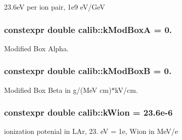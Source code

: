 23.\-6e\-V per ion pair, 1e9 e\-V/\-Ge\-V 

\hypertarget{namespacecalib_a16e735162e8ea0d3353c964b4a262820}{
\subsubsection[{k\-Mod\-Box\-A}]{\setlength{\rightskip}{0pt plus 5cm}constexpr double calib\-::k\-Mod\-Box\-A = 0.}}\label{namespacecalib_a16e735162e8ea0d3353c964b4a262820}


Modified Box Alpha. 

\hypertarget{namespacecalib_a72195815709970d1ebc8c4e1f3f9ee69}{
\subsubsection[{k\-Mod\-Box\-B}]{\setlength{\rightskip}{0pt plus 5cm}constexpr double calib\-::k\-Mod\-Box\-B = 0.}}\label{namespacecalib_a72195815709970d1ebc8c4e1f3f9ee69}


Modified Box Beta in g/(Me\-V cm)$\ast$k\-V/cm. 

\hypertarget{namespacecalib_aba19df99e169a2fe2382757e26216f88}{
\subsubsection[{k\-Wion}]{\setlength{\rightskip}{0pt plus 5cm}constexpr double calib\-::k\-Wion = 23.\-6e-\/6}}\label{namespacecalib_aba19df99e169a2fe2382757e26216f88}


ionization potenial in L\-Ar, 23. e\-V = 1e, Wion in Me\-V/e 


